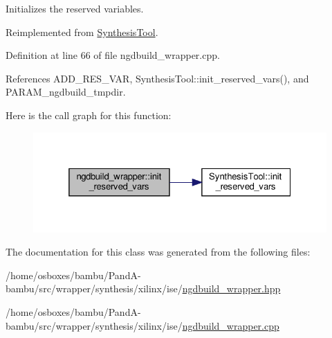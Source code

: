 Initializes the reserved variables. 



Reimplemented from \hyperlink{classSynthesisTool_a85b4a4fa0cc60e5325a79d7479c505b7}{Synthesis\+Tool}.



Definition at line 66 of file ngdbuild\+\_\+wrapper.\+cpp.



References A\+D\+D\+\_\+\+R\+E\+S\+\_\+\+V\+AR, Synthesis\+Tool\+::init\+\_\+reserved\+\_\+vars(), and P\+A\+R\+A\+M\+\_\+ngdbuild\+\_\+tmpdir.

Here is the call graph for this function\+:
\nopagebreak
\begin{figure}[H]
\begin{center}
\leavevmode
\includegraphics[width=325pt]{de/d59/classngdbuild__wrapper_a5be42dfc012dc28753f35ddddd890181_cgraph}
\end{center}
\end{figure}


The documentation for this class was generated from the following files\+:\begin{DoxyCompactItemize}
\item 
/home/osboxes/bambu/\+Pand\+A-\/bambu/src/wrapper/synthesis/xilinx/ise/\hyperlink{ngdbuild__wrapper_8hpp}{ngdbuild\+\_\+wrapper.\+hpp}\item 
/home/osboxes/bambu/\+Pand\+A-\/bambu/src/wrapper/synthesis/xilinx/ise/\hyperlink{ngdbuild__wrapper_8cpp}{ngdbuild\+\_\+wrapper.\+cpp}\end{DoxyCompactItemize}
